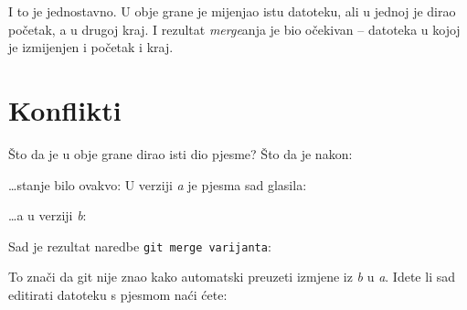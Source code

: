 I to je jednostavno.
U obje grane je mijenjao istu datoteku, ali u jednoj je dirao početak, a u drugoj kraj.
I rezultat \emph{merge}anja je bio očekivan -- datoteka u kojoj je izmijenjen i početak i kraj.

\section*{Konflikti}

Što da je u obje grane dirao isti dio pjesme?
Što da je nakon:



\dots{}stanje bilo ovakvo:
U verziji \emph a je pjesma sad glasila:


\dots{}a u verziji \emph b:


Sad je rezultat naredbe \verb+git merge varijanta+:



To znači da git nije znao kako automatski preuzeti izmjene iz \emph b u \emph a.
Idete li sad editirati datoteku s pjesmom naći ćete:

